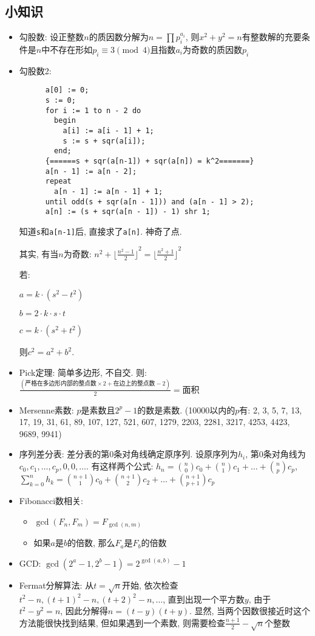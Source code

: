 \documentclass[10pt, a4paper]{article}
\begin{document}
  \subsection{小知识}
  \begin{itemize}
  \item 勾股数: 设正整数$n$的质因数分解为$n = \prod p_i ^ {a_i}$, 
    则$x^2+y^2=n$有整数解的充要条件是$n$中不存在形如$p_i \equiv 3\pmod{4}$且指数$a_i$为奇数的质因数$p_i$
  \item 勾股数2: 
    \begin{verbatim}
      a[0] := 0;
      s := 0;
      for i := 1 to n - 2 do
        begin
          a[i] := a[i - 1] + 1;
          s := s + sqr(a[i]);
        end;
      {======s + sqr(a[n-1]) + sqr(a[n]) = k^2=======}
      a[n - 1] := a[n - 2];
      repeat
        a[n - 1] := a[n - 1] + 1;
      until odd(s + sqr(a[n - 1])) and (a[n - 1] > 2);
      a[n] := (s + sqr(a[n - 1]) - 1) shr 1;
    \end{verbatim}

    知道\texttt{s}和\texttt{a[n-1]}后, 直接求了\texttt{a[n]}. 神奇了点. 

    其实, 有当$n$为奇数: $n^2+{\lfloor\frac{n^2-1}{2}\rfloor}^2={\lfloor\frac{n^2+1}{2}\rfloor}^2$

    若: 

    $a=k\cdot(s^2 - t^2)$

    $b=2\cdot k\cdot s\cdot t$

    $c=k\cdot(s^2 + t^2)$

    则$c^2=a^2+b^2$. 

  \item Pick定理: 简单多边形, 不自交. 则: $\frac{(\mbox{严格在多边形内部的整点数}\times 2+\mbox{在边上的整点数}-2)}{2}=\mbox{面积}$
  \item Mersenne素数: $p$是素数且$2^p-1$的数是素数. (10000以内的$p$有: 2, 3, 5, 7, 13, 17, 19, 31, 61, 89, 107, 127, 521, 607, 1279, 2203, 2281, 3217, 4253, 4423, 9689, 9941)
  \item 序列差分表: 差分表的第$0$条对角线确定原序列. 
      设原序列为$h_i$, 第$0$条对角线为$c_0,c_1,\ldots,c_p,0,0,\ldots$. 
      有这样两个公式: 
      $h_n = \binom{n}{0}c_0 + \binom{n}{1}c_1 + \ldots + \binom{n}{p} c_p$, 
      $\sum_{k = 0}^{n}h_k = \binom{n+1}{1}c_0 + \binom{n+1}{2}c_2 + \ldots + \binom{n+1}{p+1}c_p$
  \item Fibonacci数相关: 
    \begin{itemize}
    \item $\gcd(F_n,F_m)=F_{\gcd(n,m)}$
    \item 如果$a$是$b$的倍数, 那么$F_a$是$F_b$的倍数
    \end{itemize}
  \item GCD:
    $\gcd(2^a-1,2^b-1)=2^{\gcd(a,b)}-1$
  \item Fermat分解算法: 
    从$t=\sqrt{n}$开始, 
    依次检查$t^2-n,(t+1)^2-n,(t+2)^2-n,\ldots$, 
    直到出现一个平方数$y$, 
    由于$t ^ 2 - y ^ 2 = n$, 
    因此分解得$n = (t -y)(t + y)$. 
    显然, 当两个因数很接近时这个方法能很快找到结果, 
    但如果遇到一个素数, 则需要检查$\frac{n + 1}{2} - \sqrt{n}$个整数
  \end{itemize}
\end{document}
